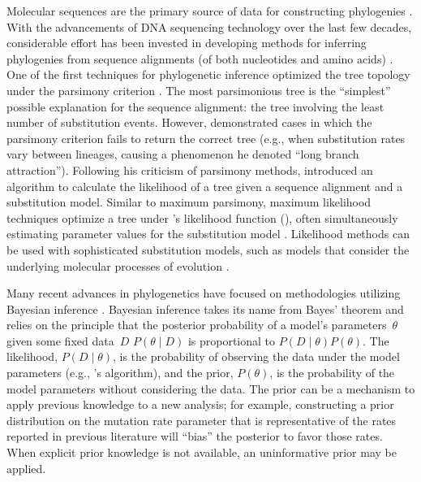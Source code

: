 \documentclass[12pt,letterpaper]{article}
\newcommand{\aposcite}[2]{\citeauthor{#1}'s #2 (\citeyear{#1})}
\begin{document}
Molecular sequences are the primary source of data for constructing phylogenies \parencite{Baum:2008}. With the advancements of DNA sequencing technology over the last few decades, considerable effort has been invested in developing methods for inferring phylogenies from sequence alignments (of both nucleotides and amino acids) \parencite{Felsenstein:2005}. One of the first techniques for phylogenetic inference optimized the tree topology under the parsimony criterion \parencite{Fitch:1971}. The most parsimonious tree is the \enquote{simplest} possible explanation for the  sequence alignment: the tree involving the least number of substitution events. However, \textcite{Felsenstein:1978} demonstrated cases in which the parsimony criterion fails to return the correct tree (e.g., when substitution rates vary between lineages, causing a phenomenon he denoted \enquote{long branch attraction}). Following his criticism of parsimony methods, \textcite{Felsenstein:1981} introduced an algorithm to calculate the likelihood of a tree given a sequence alignment and a substitution model. Similar to maximum parsimony, maximum likelihood techniques optimize a tree under \aposcite{Felsenstein:1981}{likelihood function}, often simultaneously estimating parameter values for the substitution model \parencite{Felsenstein:2005}. Likelihood methods can be used with sophisticated substitution models, such as models that consider the underlying molecular processes of evolution \parencite[e.g.,][]{Hasegawa:1985}.

Many recent advances in phylogenetics have focused on methodologies utilizing Bayesian inference \parencites{Huelsenbeck:2001a}{Drummond:2002}. Bayesian inference takes its name from Bayes' theorem \parencite{Bayes:1763} and relies on the principle that the posterior probability of a model's parameters~$\theta$ given some fixed data~$D$ $P\left(\theta\mid D\right)$ is proportional to $P\left(D\mid \theta\right) P\left(\theta\right)$. The likelihood, $P\left(D\mid \theta\right)$, is the probability of observing the data under the model parameters (e.g., \citeauthor{Felsenstein:1981}'s \citeyear{Felsenstein:1981} algorithm), and the prior, $P\left(\theta\right)$, is the probability of the model parameters without considering the data. The prior can be a mechanism to apply previous knowledge to a new analysis; for example, constructing a prior distribution on the mutation rate parameter that is representative of the rates reported in previous literature will \enquote{bias} the posterior to favor those rates. When explicit prior knowledge is not available, an uninformative prior may be applied.
\end{document}
